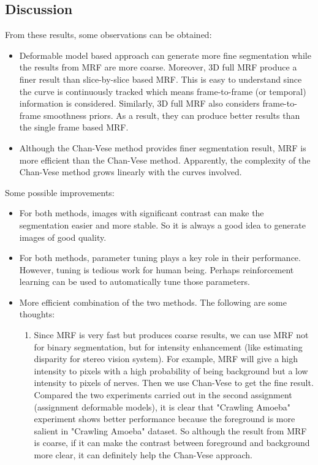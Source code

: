 \documentclass[a4paper]{article}
\begin{document}
\begin{enumerate}
\section{Discussion}
    From these results, some observations can be obtained:
\begin{itemize}
	\item Deformable model based approach can generate more fine segmentation while the results from MRF are more coarse. Moreover, $3$D full MRF produce a finer result than slice-by-slice based MRF. This is easy to understand since the curve is continuously tracked which means frame-to-frame (or temporal) information is considered. Similarly, $3$D full MRF also considers frame-to-frame smoothness priors. As a result, they can produce better results than the single frame based MRF. 
	\item Although the Chan-Vese method provides finer segmentation result, MRF is more efficient than the Chan-Vese method. Apparently, the complexity of the Chan-Vese method grows linearly with the curves involved. 
\end{itemize}
Some possible improvements:
	\begin{itemize}
		\item For both methods, images with significant contrast can make the segmentation easier and more stable. So it is always a good idea to generate images of good quality.
		\item For both methods, parameter tuning plays a key role in their performance. However, tuning is tedious work for human being. Perhaps reinforcement learning can be used to automatically tune those parameters.
		\item More efficient combination of the two methods. The following are some thoughts:
		\begin{enumerate}
			\item Since MRF is very fast but produces coarse results, we can use MRF not for binary segmentation, but for intensity enhancement (like estimating disparity for stereo vision system). For example, MRF will give a high intensity to pixels with a high probability of being background but a low intensity to pixels of nerves. Then we use Chan-Vese to get the fine result. Compared the two experiments carried out in the second assignment (assignment deformable models), it is clear that "Crawling Amoeba" experiment shows better performance because the foreground is more salient in "Crawling Amoeba" dataset. So although the result from MRF is coarse, if it can make the contrast between foreground and background more clear, it can definitely help the Chan-Vese approach.

\end{enumerate}
\end{itemize}
\end{enumerate}
\end{document}
